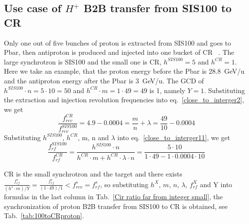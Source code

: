\subsection{Use case of $H^{+}$ B2B transfer from SIS100 to CR} 
Only one out of five bunches of proton is extracted from SIS100 and goes to Pbar, then antiproton is produced and  injected into one bucket of CR ~\cite{steck_demonstration_2011}. The large synchrotron is SIS100 and the small one is CR, $h^{\mathit{SIS100}}=5$ and $h^{\mathit{CR}}=1$. Here we take an example, that the proton energy before the Pbar is \SI{28.8}{GeV/\atomicmassunit} and the antiproton energy after the Pbar is \SI{3}{GeV/\atomicmassunit}. The GCD of $h^{\mathit{SIS100}}\cdot n=5\cdot10=50$ and $h^{\mathit{CR}} \cdot m=1\cdot 49=49$ is 1, namely $Y=1$. Substituting the extraction and injection revolution frequencies into eq.~\ref{close_to_interger2}, we get
\begin{equation} 
\frac{f_{\mathit{rev}}^{\mathit{CR}}}{f_{\mathit{rev}}^{\mathit{SIS100}}}=4.9-0.0004=\frac{m}{n}+ \lambda=\frac{49}{10}-0.0004
\end{equation}
Substituting $h^{\mathit{SIS100}}$, $h^{\mathit{CR}}$, m, n and $\lambda$ into eq.~\ref{close_to_interger11}, we get
\begin{equation} 
\frac{f_{\mathit{rf}}^{\mathit{SIS100}}}{f_{\mathit{rf}}^{\mathit{CR}}}=\frac{h^{\mathit{SIS100}}\cdot n}{h^{\mathit{CR}} \cdot m+ h^{\mathit{CR}} \cdot\lambda\cdot n}=\frac{5\cdot 10}{1 \cdot 49- 1 \cdot0.0004\cdot 10}
\end{equation}

CR is the small synchrotron and the target and there exists $\frac{f_{\mathit{rf}}^{s}}{(h^s\cdot m)/Y}=\frac{f_{\mathit{rf}}^{s}}{(1\cdot 49)/1}<f_{\mathit{rev}}^{s}=f_{\mathit{rf}}^{s}$, so substituting $h^X$, $m$, $n$, $\lambda$, $f_{\mathit{rf}}^{X}$ and Y into formulas in the last column in Tab.~\ref{Cir ratio far from integer small}, the synchronization of proton B2B transfer from SIS100 to CR is obtained, see Tab.~\ref{tab:100toCRproton}.

